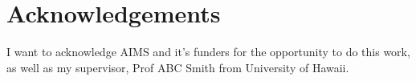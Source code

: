 \chapter*{Acknowledgements}

I want to acknowledge AIMS and it's funders for the opportunity to do this work, as well as my supervisor, Prof ABC Smith from University of Hawaii.


